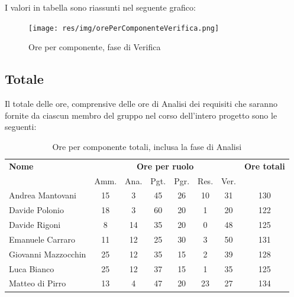 I valori in tabella sono riassunti nel seguente grafico: \\ 

    \begin{figure}[H]
      \begin{center}
        \texttt{[image: res/img/orePerComponenteVerifica.png]}
      \caption{Ore per componente, fase di Verifica}
      \end{center} 
    \end{figure}    
   
    
    
\pagebreak
\subsection{Totale}
Il totale delle ore, comprensive delle ore di Analisi dei requisiti che saranno fornite da ciascun membro
del gruppo nel corso dell’intero progetto sono le seguenti:

\begin{table}[H]
\begin{tabular}{lccccccc}
\toprule
    \textbf{Nome}  & \multicolumn{6}{c}{\textbf{Ore per ruolo}} & \textbf{Ore totali} \\
     & Amm. & Ana. & Pgt. & Pgr. & Res. & Ver. & \\
    \midrule
   
	   Andrea Mantovani & 15 & 3 & 45 & 26 & 10 & 31 & 130 \\
	     Davide Polonio & 18 & 3 & 60 & 20 & 1 & 20 & 122 \\
	      Davide Rigoni & 8 & 14 & 35 & 20 & 0 & 48 & 125 \\
	   Emanuele Carraro & 11 & 12 & 25 & 30 & 3 & 50 & 131 \\
	Giovanni Mazzocchin & 25 & 12 & 35 & 15 & 2 & 39 & 128 \\ 
	        Luca Bianco & 25 & 12 & 37 & 15 & 1 & 35 & 125 \\ 
	    Matteo di Pirro & 13 & 4 & 47 & 20 & 23 & 27 & 134 \\ 
   
    \bottomrule
\end{tabular}
\caption{Ore per componente totali, inclusa la fase di Analisi}
\end{table}

